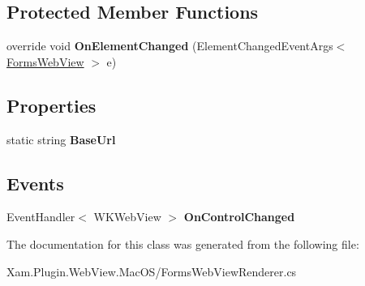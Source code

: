 \subsection*{Protected Member Functions}
\begin{DoxyCompactItemize}
\item 
\mbox{\label{class_xam_1_1_plugin_1_1_web_view_1_1_mac_o_s_1_1_forms_web_view_renderer_ae2a57bbeddc4839da3e2ea2cf19135ef}} 
override void {\bfseries On\+Element\+Changed} (Element\+Changed\+Event\+Args$<$ \hyperlink{class_xam_1_1_plugin_1_1_web_view_1_1_abstractions_1_1_forms_web_view}{Forms\+Web\+View} $>$ e)
\end{DoxyCompactItemize}
\subsection*{Properties}
\begin{DoxyCompactItemize}
\item 
\mbox{\label{class_xam_1_1_plugin_1_1_web_view_1_1_mac_o_s_1_1_forms_web_view_renderer_a52d994db712f6772ffbd953a66c1ecd3}} 
static string {\bfseries Base\+Url}
\end{DoxyCompactItemize}
\subsection*{Events}
\begin{DoxyCompactItemize}
\item 
\mbox{\label{class_xam_1_1_plugin_1_1_web_view_1_1_mac_o_s_1_1_forms_web_view_renderer_a83570b7b44bda48cb9283d341582d564}} 
Event\+Handler$<$ W\+K\+Web\+View $>$ {\bfseries On\+Control\+Changed}
\end{DoxyCompactItemize}


The documentation for this class was generated from the following file\+:\begin{DoxyCompactItemize}
\item 
Xam.\+Plugin.\+Web\+View.\+Mac\+O\+S/Forms\+Web\+View\+Renderer.\+cs\end{DoxyCompactItemize}
